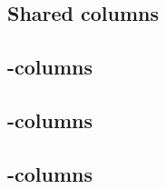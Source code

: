\subsection{Shared columns}           \label{oob: columns: shared}         
\subsection{\macro{}-columns}         \label{oob: columns: macro}          
\subsection{\scenario{}-columns}      \label{oob: columns: scenario}       
\subsection{\computation{}-columns}   \label{oob: columns: computation}    
